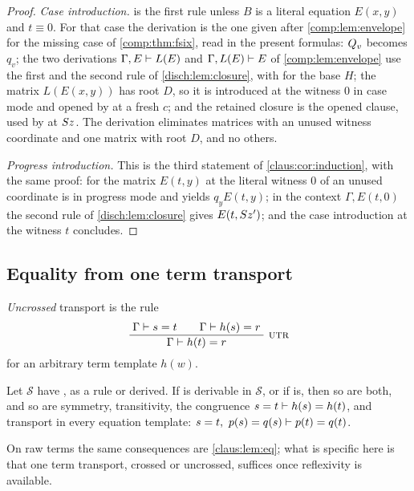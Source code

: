 \begin{proof}
\emph{Case introduction.}  is the first rule unless $B$ is
a literal equation $E(x,y)$ and $t\equiv 0$. For that case the derivation
is the one given after \cref{comp:lem:envelope} for the missing case of
\cref{comp:thm:fsix}, read in the present formulas: $Q_{v}$ becomes $q_v$;
the two derivations $\Gamma,E\vdash L(E)$ and $\Gamma,L(E)\vdash E$ of
\cref{comp:lem:envelope} use the first and the second rule of
\cref{disch:lem:closure}, with  for the base $H$; the
matrix $L(E(x,y))$ has root $D$, so it is introduced at the witness $0$ in
case mode and opened by  at a fresh $c$; and the retained
closure is the opened clause, used by  at $S z$. The
derivation eliminates matrices with an unused witness coordinate and one
matrix with root $D$, and no others.

\emph{Progress introduction.} This is the third statement of
\cref{claus:cor:induction}, with the same proof:  for the
matrix $E(t,y)$ at the literal witness $0$ of an unused coordinate is in
progress mode and yields $q_yE(t,y)$; in the context $\Gamma,E(t,0)$ the
second rule of \cref{disch:lem:closure} gives $E(t,S z')$; and the case
introduction at the witness $t$ concludes.
\end{proof}

\subsection{Equality from one term transport}

\emph{Uncrossed} transport is the rule
\begin{equation}
 \infrule{\Gamma\proves s=t\qquad\Gamma\proves h(s)=r}
         {\Gamma\proves h(t)=r}\ \rulename{UTr}
 \label{disch:eq:utr}
\end{equation}
for an arbitrary term template $h(w)$.

\begin{lemma}
\label{disch:lem:equality}
Let $\mathcal S$ have , as a rule or derived. If
 is derivable in $\mathcal S$, or if  is, then
so are both, and so are symmetry, transitivity, the congruence
$s=t\vdash h(s)=h(t)$, and transport in every equation template:
$s=t,\ p(s)=q(s)\proves p(t)=q(t)$.
\end{lemma}

On raw terms the same consequences are \cref{claus:lem:eq};
what is specific here is that one term transport, crossed or uncrossed,
suffices once reflexivity is available.

